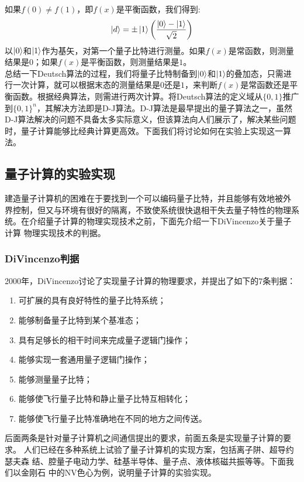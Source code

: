 \documentclass[a4paper]{article}
\begin{document}
如果$ f(0) \neq f(1) $，即$ f(x)  $是平衡函数，我们得到:
\begin{equation}\label{key}
\ket{d} = \pm\ket{1}\qty(\dfrac{\ket{0} - \ket{1}}{\sqrt{2}})
\end{equation}
以$ \ket{0} $和$ \ket{1} $作为基矢，对第一个量子比特进行测量。如果$ f(x)  $是常函数，则测量结果是$ 0 $；如果$ f(x)  $是平衡函数，则测量结果是$ 1 $。\\
总结一下Deutsch算法的过程，我们将量子比特制备到$ \ket{0} $和$ \ket{1} $的叠加态，只需进行一次计算，就可以根据末态的测量结果是$ 0  $还是$ 1 $，来判断$ f(x)  $是常函数还是平衡函数。根据经典算法，则需进行两次计算。将Deutsch算法的定义域从$ \{0,1\} $推广到$ \{0,1\}^n $，其解决方法即是D-J算法。D-J算法是最早提出的量子算法之一，虽然D-J算法解决的问题不具备太多实际意义，但该算法向人们展示了，解决某些问题时，量子计算能够比经典计算更高效。下面我们将讨论如何在实验上实现这一算法。

\subsection{量子计算的实验实现}
建造量子计算机的困难在于要找到一个可以编码量子比特，并且能够有效地被外
界控制，但又与环境有很好的隔离，不致使系统很快退相干失去量子特性的物理系
统。在介绍量子计算的物理实现技术之前，下面先介绍一下DiVincenzo关于量子计算
物理实现技术的判据。
\subsubsection{DiVincenzo判据}
2000年，DiVincenzo讨论了实现量子计算的物理要求，并提出了如下的7条判据：
\begin{enumerate}
	\item 可扩展的具有良好特性的量子比特系统；
	\item 能够制备量子比特到某个基准态；
	\item 具有足够长的相干时间来完成量子逻辑门操作；
    \item 能够实现一套通用量子逻辑门操作；
	\item 能够测量量子比特；
	\item 能够使飞行量子比特和静止量子比特互相转化；
	\item 能够使飞行量子比特准确地在不同的地方之间传送。
\end{enumerate}
后面两条是针对量子计算机之间通信提出的要求，前面五条是实现量子计算的要求。
人们已经在多种系统上试验了量子计算机的实现方案，包括离子阱、超导约瑟夫森
结、腔量子电动力学、硅基半导体、量子点、液体核磁共振等等。下面我们以金刚石
中的NV色心为例，说明量子计算的实验实现。
\end{document}
